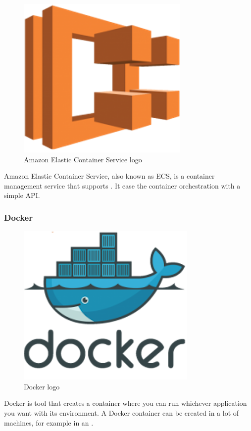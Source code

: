 \begin{figure}[H]
\centering
\includegraphics[scale=0.1]{resources/ecs-logo.png}
\caption{Amazon Elastic Container Service logo}
\end{figure}

Amazon Elastic Container Service, also known as ECS\cite{ecs}, is a container management service that supports . It ease the container orchestration with a simple API.

\subsubsection*{Docker} \label{docker}

\begin{figure}[H]
\centering
\includegraphics[scale=0.1]{resources/docker-logo.png}
\caption{Docker logo}
\end{figure}

Docker\cite{docker} is tool that creates a container where you can run whichever application you want with its environment. A Docker container can be created in a lot of machines, for example in an .

